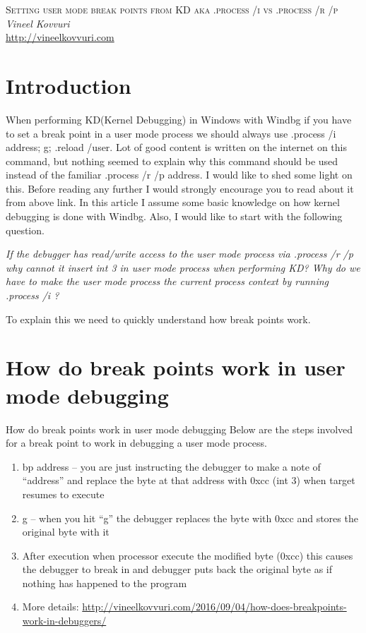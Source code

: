 \documentclass{article}
\begin{document}
\begin{titlepage}
   \begin{center}
      \Large\textsc{Setting user mode break points from KD aka .process /i vs .process /r /p}\\
      \vspace{5mm}
      \Large\textit{Vineel Kovvuri}\\
      \url{http://vineelkovvuri.com}\\
   \end{center}
\end{titlepage}

\tableofcontents

\newpage
\section{Introduction}
When performing KD(Kernel Debugging) in Windows with Windbg if you have to set a break point in a user mode process we should always use .process /i address; g; .reload /user. Lot of good content is written on the internet on this command, but nothing seemed to explain why this command should be used instead of the familiar .process /r /p address. I would like to shed some light on this. Before reading any further I would strongly encourage you to read about it from above link. In this article I assume some basic knowledge on how kernel debugging is done with Windbg. Also, I would like to start with the following question.

\textit{If the debugger has read/write access to the user mode process via .process /r /p why cannot it insert int 3 in user mode process when performing KD? Why do we have to make the user mode process the current process context by running .process /i ?}

To explain this we need to quickly understand how break points work.


\section{How do break points work in user mode debugging}
How do break points work in user mode debugging
Below are the steps involved for a break point to work in debugging a user mode process.

\begin{enumerate}[noitemsep]
    \item bp address – you are just instructing the debugger to make a note of “address” and replace the byte at that address with 0xcc (int 3) when target resumes to execute
    \item g – when you hit “g” the debugger replaces the byte with 0xcc and stores the original byte with it
    \item After execution when processor execute the modified byte (0xcc) this causes the debugger to break in and debugger puts back the original byte as if nothing has happened to the program
    \item More details: \url{http://vineelkovvuri.com/2016/09/04/how-does-breakpoints-work-in-debuggers/}
\end{enumerate}
\end{document}
